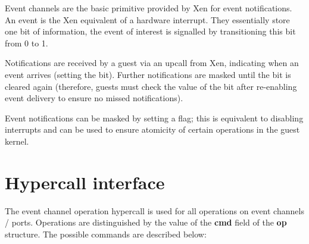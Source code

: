 \documentclass[11pt,twoside,final,openright,a4paper]{report}
\newcommand{\hypercall}[1]{\vspace{2mm}{\sf #1}}
\begin{document}
Event channels are the basic primitive provided by Xen for event
notifications.  An event is the Xen equivalent of a hardware
interrupt.  They essentially store one bit of information, the event
of interest is signalled by transitioning this bit from 0 to 1.

Notifications are received by a guest via an upcall from Xen,
indicating when an event arrives (setting the bit).  Further
notifications are masked until the bit is cleared again (therefore,
guests must check the value of the bit after re-enabling event
delivery to ensure no missed notifications).

Event notifications can be masked by setting a flag; this is
equivalent to disabling interrupts and can be used to ensure atomicity
of certain operations in the guest kernel.

\section{Hypercall interface}

\hypercall{event\_channel\_op(evtchn\_op\_t *op)}

The event channel operation hypercall is used for all operations on
event channels / ports.  Operations are distinguished by the value of
the {\bf cmd} field of the {\bf op} structure.  The possible commands
are described below:
\end{document}
